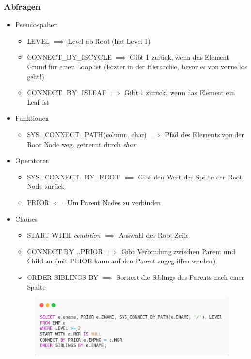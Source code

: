 \subsubsection{Abfragen}
\begin{itemize}
    \item Pseudospalten
    \begin{itemize}
        \item LEVEL $\implies$ Level ab Root (hat Level 1)
        \item CONNECT\_BY\_ISCYCLE $\implies$ Gibt 1 zurück, wenn das Element Grund für einen Loop ist (letzter in der Hierarchie, bevor es von vorne los geht!)
        \item CONNECT\_BY\_ISLEAF $\implies$ Gibt 1 zurück, wenn das Element ein Leaf ist
    \end{itemize}
    \item Funktionen
    \begin{itemize}
        \item SYS\_CONNECT\_PATH(column, char) $\implies$ Pfad des Elements von der Root Node weg, getrennt durch \textit{char}
    \end{itemize}
    \item Operatoren
    \begin{itemize}
        \item SYS\_CONNECT\_BY\_ROOT $\impliedby$ Gibt den Wert der Spalte der Root Node zurück
        \item PRIOR $\impliedby$ Um Parent Nodes zu verbinden
    \end{itemize}
    \item Clauses
    \begin{itemize}
        \item START WITH \textit{condition} $\implies$ Auswahl der Root-Zeile
        \item CONNECT BY \dots PRIOR $\implies$ Gibt Verbindung zwischen Parent und Child an (mit PRIOR kann auf den Parent zugegriffen werden)
        \item ORDER SIBLINGS BY $\implies$ Sortiert die Siblings des Parents nach einer Spalte
    \end{itemize}
    \begin{figure}[H]
        \centering
        \includegraphics[scale=.3]{res/themekorb_2/hierarchical.png} 
    \end{figure}
\end{itemize}